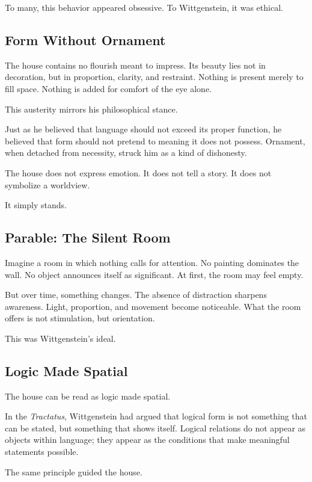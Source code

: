 \documentclass[11pt]{article}
\begin{document}
To many, this behavior appeared obsessive. To Wittgenstein, it was ethical.

\subsection*{Form Without Ornament}

The house contains no flourish meant to impress. Its beauty lies not in decoration, but in proportion, clarity, and restraint. Nothing is present merely to fill space. Nothing is added for comfort of the eye alone.

This austerity mirrors his philosophical stance.

Just as he believed that language should not exceed its proper function, he believed that form should not pretend to meaning it does not possess. Ornament, when detached from necessity, struck him as a kind of dishonesty.

The house does not express emotion. It does not tell a story. It does not symbolize a worldview.

It simply stands.

\subsection*{Parable: The Silent Room}

Imagine a room in which nothing calls for attention. No painting dominates the wall. No object announces itself as significant. At first, the room may feel empty.

But over time, something changes. The absence of distraction sharpens awareness. Light, proportion, and movement become noticeable. What the room offers is not stimulation, but orientation.

This was Wittgenstein’s ideal.

\subsection*{Logic Made Spatial}

The house can be read as logic made spatial.

In the \emph{Tractatus}, Wittgenstein had argued that logical form is not something that can be stated, but something that shows itself. Logical relations do not appear as objects within language; they appear as the conditions that make meaningful statements possible.

The same principle guided the house.
\end{document}
